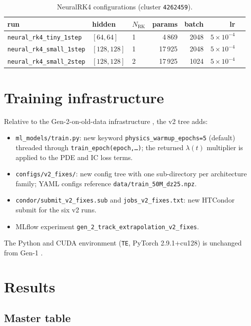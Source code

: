 \documentclass[a4paper,11pt]{article}
\begin{document}
\begin{table}[htbp]
\centering\small
\caption{NeuralRK4 configurations (cluster \texttt{4262459}).}
\label{gen2new:tab:nrk4_configs}
\begin{tabular}{lllrrrr}
\toprule
run & hidden & $N_{\mathrm{RK}}$ & params & batch & lr \\
\midrule
\texttt{neural\_rk4\_tiny\_1step}  & $[64,64]$   & 1 &  4\,869 & 2048 & $5\!\times\!10^{-4}$ \\
\texttt{neural\_rk4\_small\_1step} & $[128,128]$ & 1 & 17\,925 & 2048 & $5\!\times\!10^{-4}$ \\
\texttt{neural\_rk4\_small\_2step} & $[128,128]$ & 2 & 17\,925 & 1024 & $5\!\times\!10^{-4}$ \\
\bottomrule
\end{tabular}
\end{table}

\section{Training infrastructure}\label{gen2new:sec:training}

Relative to the Gen-2-on-old-data infrastructure \cite{gen2oldreport},
the v2 tree adds:
\begin{itemize}
\item \texttt{ml\_models/train.py}: new keyword
  \texttt{physics\_warmup\_epochs=5} (default) threaded through
  \texttt{train\_epoch(epoch,\ldots)}; the returned
  $\lambda(t)$ multiplier is applied to the PDE and IC loss terms.
\item \texttt{configs/v2\_fixes/}: new config tree with one
  sub-directory per architecture family; YAML configs reference
  \texttt{data/train\_50M\_dz25.npz}.
\item \texttt{condor/submit\_v2\_fixes.sub} and
  \texttt{jobs\_v2\_fixes.txt}: new HTCondor submit for the six v2
  runs.
\item MLflow experiment \texttt{gen\_2\_track\_extrapolation\_v2\_fixes}.
\end{itemize}
The Python and CUDA environment (\texttt{TE}, PyTorch 2.9.1+cu128) is
unchanged from Gen-1 \cite{gen1report}.

\section{Results}\label{gen2new:sec:results}

\subsection{Master table}
\end{document}
